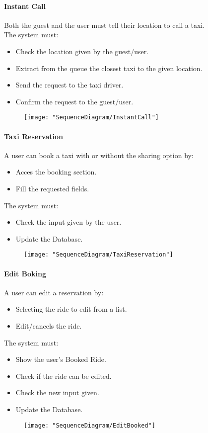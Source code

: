 		\paragraph{Instant Call}
			Both the guest and the user must tell their location to call a taxi.\\
			The system must:\begin{itemize}
				\item Check the location given by the guest/user.
				\item Extract from the queue the closest taxi to the given location.
				\item Send the request to the taxi driver.
				\item Confirm the request to the guest/user.
			\end{itemize}
			\begin{figure}[h!]
				\centering
				\texttt{[image: "SequenceDiagram/InstantCall"]}
			\end{figure}
			\newpage

		\paragraph{Taxi Reservation}
			A user can book a taxi with or without the sharing option by:\begin{itemize}
				\item Acces the booking {section}.
				\item Fill the requested fields.
			\end{itemize}
			The system must:\begin{itemize}
				\item Check the input given by the user.
				\item Update the Database.
			\end{itemize}
			\newpage
			\begin{figure}[h!]
				\centering
				\texttt{[image: "SequenceDiagram/TaxiReservation"]}
			\end{figure}
			\newpage

		\paragraph{Edit Boking}
			A user can edit a reservation by:\begin{itemize}
				\item Selecting the ride to edit from a list.
				\item Edit/cancels the ride.
			\end{itemize}
			The system must:\begin{itemize}
				\item Show the user's Booked Ride.
				\item Check if the ride can be edited.
				\item Check the new input given.
				\item Update the Database.
			\end{itemize}
				\newpage
				\begin{figure}[h!]
					\centering
					\texttt{[image: "SequenceDiagram/EditBooked"]}
				\end{figure}
				\newpage

